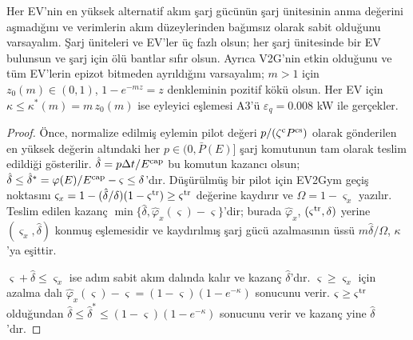 \begin{lemma}[EV2Gym'de A3]\label{lem:a3}
Her EV'nin en yüksek alternatif akım şarj gücünün şarj ünitesinin anma değerini aşmadığını ve verimlerin akım düzeylerinden bağımsız olarak sabit olduğunu varsayalım.
Şarj üniteleri ve EV'ler üç fazlı olsun; her şarj ünitesinde bir EV bulunsun ve şarj için ölü bantlar sıfır olsun.
Ayrıca V2G'nin etkin olduğunu ve tüm EV'lerin epizot bitmeden ayrıldığını varsayalım; $m>1$ için $z_0(m)\in(0,1)$, $1-e^{-mz}=z$ denkleminin pozitif kökü olsun.
Her EV için $\kappa\le\kappa^{*}(m)=m\,z_0(m)$ ise eyleyici eşlemesi A3'ü $\varepsilon_q=0.008$ kW ile gerçekler.
\end{lemma}

\begin{proof}
Önce, normalize edilmiş eylemin pilot değeri $p/(\zeta^{\mathrm c}P^{\mathrm{cs}})$ olarak gönderilen en yüksek değerin altındaki her $p\in(0,\bar P(E)]$ şarj komutunun tam olarak teslim edildiği gösterilir.
$\hat\delta=p\Delta t/E^{\mathrm{cap}}$ bu komutun kazancı olsun; $\hat\delta\le\hat\delta^{*}=\varphi(E)/E^{\mathrm{cap}}-\varsigma\le\delta$'dır.
Düşürülmüş bir pilot için EV2Gym geçiş noktasını $\varsigma_x=1-(\hat\delta/\delta)(1-\varsigma^{\mathrm{tr}})\ge\varsigma^{\mathrm{tr}}$ değerine kaydırır ve $\Omega=1-\varsigma_x$ yazılır.
Teslim edilen kazanç $\min\{\hat\delta,\hat\varphi_x(\varsigma)-\varsigma\}$'dir; burada $\hat\varphi_x$, $(\varsigma^{\mathrm{tr}},\delta)$ yerine $(\varsigma_x,\hat\delta)$ konmuş  eşlemesidir ve kaydırılmış şarj gücü azalmasının üssü $m\hat\delta/\Omega$, $\kappa$'ya eşittir.

$\varsigma+\hat\delta\le\varsigma_x$ ise adım sabit akım dalında kalır ve kazanç $\hat\delta$'dır.
$\varsigma\ge\varsigma_x$ için azalma dalı $\hat\varphi_x(\varsigma)-\varsigma=(1-\varsigma)(1-e^{-\kappa})$ sonucunu verir.
$\varsigma\ge\varsigma^{\mathrm{tr}}$ olduğundan  $\hat\delta\le\hat\delta^{*}\le(1-\varsigma)(1-e^{-\kappa})$ sonucunu verir ve kazanç yine $\hat\delta$'dır.


\end{proof}
